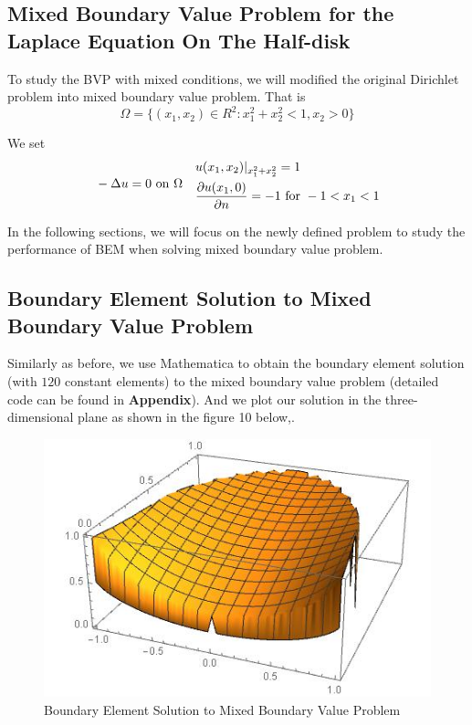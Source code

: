 \documentclass[a4paper,12pt]{article}
\begin{document}
\subsection{Mixed Boundary Value Problem for the Laplace Equation On The Half-disk}
To study the BVP with mixed conditions, we will modified the original Dirichlet problem into mixed boundary value problem. That is
\begin{equation}
\Omega = \{ (x_1,x_2) \in R^2: x_1^2 + x_2^2 < 1, x_2 > 0 \}
\end{equation}

\par We set
\begin{align}
&- \Delta u = 0 \ {\rm on}\   \Omega & \begin{aligned}
&u(x_1,x_2)|_{x_1^2 + x_2^2} = 1 \\ &\frac{\partial u(x_1,0)}{\partial n} = -1 \ {\rm for} \ -1 < x_1 < 1
\end{aligned}
\end{align} 

\par In the following sections, we will focus on the newly defined problem to study the performance of BEM when solving mixed boundary value problem.

\subsection{Boundary Element Solution to Mixed Boundary Value Problem}
Similarly as before, we use Mathematica to obtain the boundary element solution (with $120$ constant elements) to the mixed boundary value problem (detailed code can be found in \textbf{Appendix}). And we plot our solution in the three-dimensional plane  as shown in the figure 10 below,.

\begin{figure}[H]
\centering
\includegraphics[scale=0.55]{BEM3.jpg}
\caption{Boundary Element Solution to Mixed Boundary Value Problem}
\end{figure}
\end{document}
